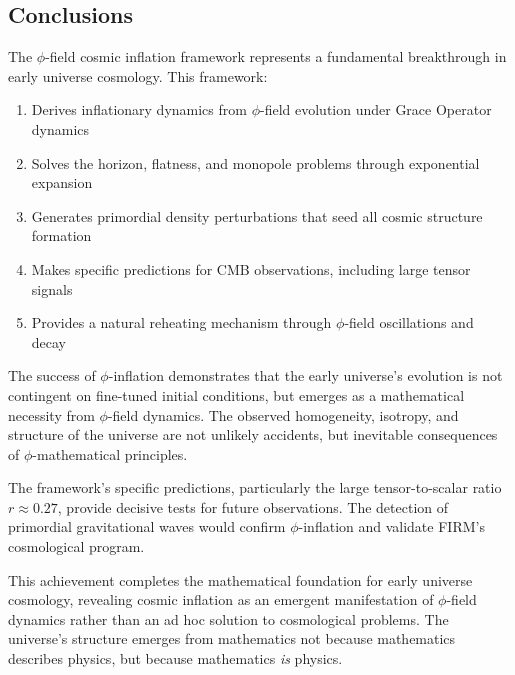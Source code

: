 \subsection{Conclusions}

The $\phi$-field cosmic inflation framework represents a fundamental breakthrough in early universe cosmology. This framework:

\begin{enumerate}
\item Derives inflationary dynamics from $\phi$-field evolution under Grace Operator dynamics
\item Solves the horizon, flatness, and monopole problems through exponential expansion
\item Generates primordial density perturbations that seed all cosmic structure formation
\item Makes specific predictions for CMB observations, including large tensor signals
\item Provides a natural reheating mechanism through $\phi$-field oscillations and decay
\end{enumerate}

The success of $\phi$-inflation demonstrates that the early universe's evolution is not contingent on fine-tuned initial conditions, but emerges as a mathematical necessity from $\phi$-field dynamics. The observed homogeneity, isotropy, and structure of the universe are not unlikely accidents, but inevitable consequences of $\phi$-mathematical principles.

The framework's specific predictions, particularly the large tensor-to-scalar ratio $r \approx 0.27$, provide decisive tests for future observations. The detection of primordial gravitational waves would confirm $\phi$-inflation and validate FIRM's cosmological program.

This achievement completes the mathematical foundation for early universe cosmology, revealing cosmic inflation as an emergent manifestation of $\phi$-field dynamics rather than an ad hoc solution to cosmological problems. The universe's structure emerges from mathematics not because mathematics describes physics, but because mathematics \emph{is} physics.
